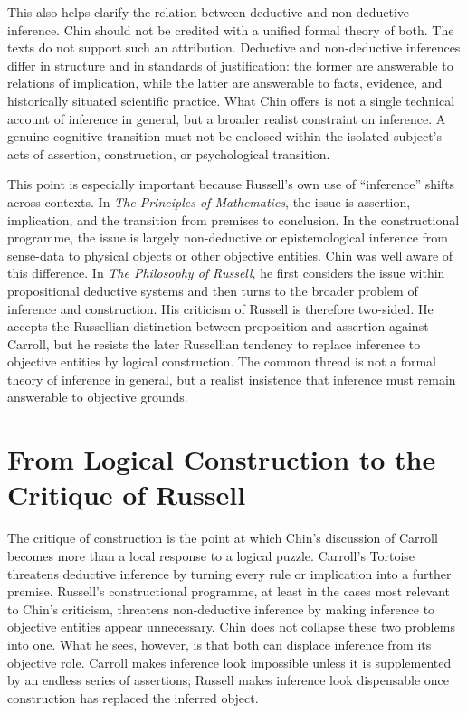 \documentclass{birkjour}
\begin{document}
This also helps clarify the relation between deductive and non-deductive inference. Chin should not be credited with a unified formal theory of both. The texts do not support such an attribution. Deductive and non-deductive inferences differ in structure and in standards of justification: the former are answerable to relations of implication, while the latter are answerable to facts, evidence, and historically situated scientific practice. What Chin offers is not a single technical account of inference in general, but a broader realist constraint on inference. A genuine cognitive transition must not be enclosed within the isolated subject's acts of assertion, construction, or psychological transition.

This point is especially important because Russell's own use of ``inference'' shifts across contexts. In \textit{The Principles of Mathematics}, the issue is assertion, implication, and the transition from premises to conclusion. In the constructional programme, the issue is largely non-deductive or epistemological inference from sense-data to physical objects or other objective entities. Chin was well aware of this difference. In \textit{The Philosophy of Russell}, he first considers the issue within propositional deductive systems and then turns to the broader problem of inference and construction. His criticism of Russell is therefore two-sided. He accepts the Russellian distinction between proposition and assertion against Carroll, but he resists the later Russellian tendency to replace inference to objective entities by logical construction. The common thread is not a formal theory of inference in general, but a realist insistence that inference must remain answerable to objective grounds.

\section{From Logical Construction to the Critique of Russell}
\label{sec:construction-russell}

The critique of construction is the point at which Chin's discussion of Carroll becomes more than a local response to a logical puzzle. Carroll's Tortoise threatens deductive inference by turning every rule or implication into a further premise. Russell's constructional programme, at least in the cases most relevant to Chin's criticism, threatens non-deductive inference by making inference to objective entities appear unnecessary. Chin does not collapse these two problems into one. What he sees, however, is that both can displace inference from its objective role. Carroll makes inference look impossible unless it is supplemented by an endless series of assertions; Russell makes inference look dispensable once construction has replaced the inferred object.
\end{document}

